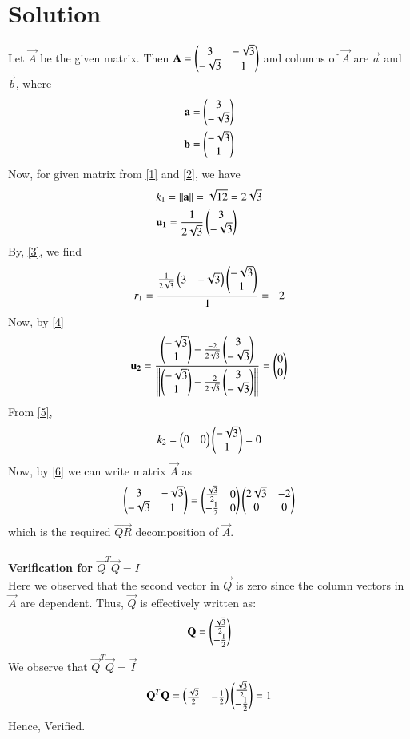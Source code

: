 \documentclass[journal,12pt,twocolumn]{IEEEtran}
\begin{document}
\section{Solution}
Let $\vec{A}$ be the given matrix. Then $\mathbf{A} = \begin{pmatrix}3 & -\sqrt{3} \\ -\sqrt{3} & 1\end{pmatrix}$ and columns of $\vec{A}$ are $\vec{a}$ and $\vec{b}$, where
\begin{align}
	\mathbf{a} = \begin{pmatrix} 3 \\ -\sqrt{3}\end{pmatrix} \\
	\mathbf{b} = \begin{pmatrix} -\sqrt{3} \\1\end{pmatrix}
\end{align}
Now, for given matrix from \eqref{1} and \eqref{2}, we have
\begin{align}
&	k_1 = \left\lVert\mathbf{a}\right\rVert = \sqrt{12} =2\sqrt{3}\\
&	\mathbf{u_1} = \frac{1}{2\sqrt{3}}\begin{pmatrix}3 \\ -\sqrt{3}\end{pmatrix}
\end{align}
By, \eqref{3}, we find
\begin{align}
	r_1 = \frac{\frac{1}{2\sqrt{3}}\begin{pmatrix}3 & -\sqrt{3}\end{pmatrix}\begin{pmatrix}-\sqrt{3} \\ 1\end{pmatrix}}{1} =-2
\end{align}
Now, by \eqref{4}
\begin{align}
	\mathbf{u_2} = \frac{\begin{pmatrix}-\sqrt{3} \\ 1\end{pmatrix}- \frac{-2}{2\sqrt{3}}\begin{pmatrix}3 \\-\sqrt{3}\end{pmatrix}}{\left\lVert\begin{pmatrix}-\sqrt{3} \\ 1\end{pmatrix}- \frac{-2}{2\sqrt{3}}\begin{pmatrix}3 \\-\sqrt{3}\end{pmatrix}\right\rVert} = \begin{pmatrix}0 \\ 0\end{pmatrix}
\end{align}
From \eqref{5},
\begin{align}
	k_2 = \begin{pmatrix}0 & 0\end{pmatrix}\begin{pmatrix}-\sqrt{3}\\ 1\end{pmatrix} = 0
\end{align}
Now, by \eqref{6} we can write matrix $\vec{A}$ as
\begin{align}
	{\ensuremath{\begin{pmatrix}3 &-\sqrt3\\-\sqrt3 & 1\end{pmatrix}}}= \begin{pmatrix}\frac{\sqrt{3}}{2}&0\\-\frac{1}{{2}}&0\end{pmatrix}
	\begin{pmatrix}2\sqrt{3} & -2\\0&0\end{pmatrix}
\end{align}
which is the required $\vec{QR}$ decomposition of $\vec{A}$.\\ \\
\textbf{Verification for $\vec{Q}^T\vec{Q}=I$}\\
Here we observed that the second vector in $\vec{Q}$ is zero since the column vectors in $\vec{A}$ are dependent. Thus, $\vec{Q}$ is effectively written as:
\begin{align}
\mathbf{Q} = \begin{pmatrix}\frac{\sqrt{3}}{2} \\-\frac{1}{{2}}\end{pmatrix} 
\end{align}
We observe that $\vec{Q}^T\vec{Q} = \vec{I}$
\begin{align}
 \mathbf{Q}^T\mathbf{Q}=\begin{pmatrix}\frac{\sqrt{3}}{2}&-\frac{1}{{2}}\end{pmatrix}\begin{pmatrix}\frac{\sqrt{3}}{2} \\-\frac{1}{{2}}\end{pmatrix} =1  
\end{align}
Hence, Verified.
\end{document}
